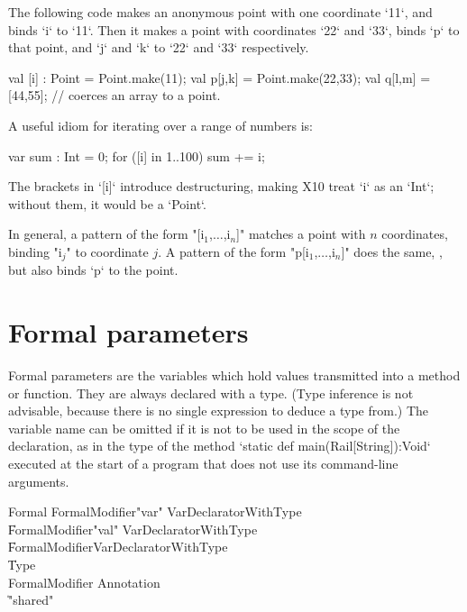 The following code makes an anonymous point with one coordinate \xcd`11`, and
binds \xcd`i` to \xcd`11`.  Then it makes a point with coordinates \xcd`22`
and \xcd`33`, binds \xcd`p` to that point, and \xcd`j` and \xcd`k` to \xcd`22`
and \xcd`33` respectively.
\begin{xten}
val [i] : Point = Point.make(11);
val p[j,k] = Point.make(22,33);
val q[l,m] = [44,55]; // coerces an array to a point.
\end{xten}

A useful idiom for iterating over a range of numbers is: 
\begin{xten}
var sum : Int = 0;
for ([i] in 1..100) sum += i;
\end{xten}
\noindent
The brackets in \xcd`[i]` introduce destructuring, making X10 treat \xcd`i`
as an \xcd`Int`; without them, it would be a \xcd`Point`.  

In general, a pattern of the form \xcdmath"[i$_1$,$\ldots$,i$_n$]" matches a
point with {$n$} coordinates, binding \xcdmath"i$_j$" to coordinate {$j$}.  
A pattern of the form \xcdmath"p[i$_1$,$\ldots$,i$_n$]" does the same, , but
also binds \xcd`p` to the point.

\section{Formal parameters}

Formal parameters are the variables which hold values transmitted into a
method or function.  
They are always declared with a type.  (Type inference is not
advisable, because there is no single expression to deduce a type from.)
The variable name can be omitted if it is not to be used in the
scope of the declaration, as in the type of the method 
\xcd`static def main(Rail[String]):Void` executed at the start of a program that
does not use its command-line arguments.

\begin{grammar}
Formal
        \: FormalModifier\star \xcd"var" VarDeclaratorWithType \\
        \| FormalModifier\star \xcd"val" VarDeclaratorWithType \\
        \| FormalModifier\star VarDeclaratorWithType \\
        \| Type \\
FormalModifier \: Annotation \\
              \| \xcd"shared" \\
\end{grammar}

